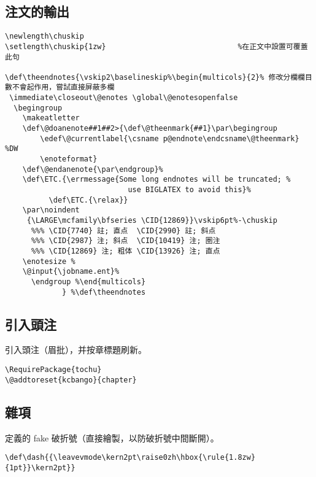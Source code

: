 \subsection{注文的輸出}

\begin{lstlisting}[firstnumber=1589]
\newlength\chuskip
\setlength\chuskip{1zw}  							 %在正文中設置可覆蓋此句

\def\theendnotes{\vskip2\baselineskip%\begin{multicols}{2}% 修改分欄欄目數不會起作用，嘗試直接屏蔽多欄
 \immediate\closeout\@enotes \global\@enotesopenfalse
  \begingroup
    \makeatletter
    \def\@doanenote##1##2>{\def\@theenmark{##1}\par\begingroup
        \edef\@currentlabel{\csname p@endnote\endcsname\@theenmark} %DW
        \enoteformat}
    \def\@endanenote{\par\endgroup}%
    \def\ETC.{\errmessage{Some long endnotes will be truncated; %
                            use BIGLATEX to avoid this}%
          \def\ETC.{\relax}}
    \par\noindent
     {\LARGE\mcfamily\bfseries \CID{12869}}\vskip6pt%-\chuskip
      %%% \CID{7740} 註; 直点  \CID{2990} 註; 斜点
      %%% \CID{2987} 注; 斜点  \CID{10419} 注; 圏注
      %%% \CID{12869} 注; 粗体 \CID{13926} 注; 直点
    \enotesize %
    \@input{\jobname.ent}%
      \endgroup %\end{multicols}
             } %\def\theendnotes
\end{lstlisting}

\subsection{引入頭注}

\par%
引入頭注（眉批），并按章標題刷新。
\begin{lstlisting}[firstnumber=1615]
\RequirePackage{tochu}
\@addtoreset{kcbango}{chapter}
\end{lstlisting}

\subsection{雜項}

\par%
定義的 fake 破折號（直接繪製，以防破折號中間斷開）。
\begin{lstlisting}[firstnumber=1619]
%\def\dash{{\leavevmode\kern1mm\raise0.1zh\hbox{\mcfamily{------}}\kern1mm}}
\def\dash{{\leavevmode\kern2pt\raise0zh\hbox{\rule{1.8zw}{1pt}}\kern2pt}}
\end{lstlisting}

